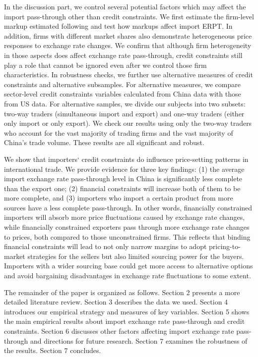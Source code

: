 In the discussion part, we control several potential factors which may affect the import pass-through other than credit constraints. We first estimate the firm-level markup estimated following \cite{dlw2012} and test how markups affect import ERPT. In addition, firms with different market shares also demonstrate heterogeneous price responses to exchange rate changes. We confirm that although firm heterogeneity in those aspects does affect exchange rate pass-through, credit constraints still play a role that cannot be ignored even after we control those firm characteristics. In robustness checks, we further use alternative measures of credit constraints and alternative subsamples. For alternative measures, we compare sector-level credit constraints variables calculated from China data with those from US data. For alternative samples, we divide our subjects into two subsets: two-way traders (simultaneous import and export) and one-way traders (either only import or only export). We check our results using only the two-way traders who account for the vast majority of trading firms and the vast majority of China's trade volume. These results are all significant and robust.

We show that importers‘ credit constraints do influence price-setting patterns in international trade. We provide evidence for three key findings: (1) the average import exchange rate pass-through level in China is significantly less complete than the export one; (2) financial constraints will increase both of them to be more complete, and (3) importers who import a certain product from more sources have a less complete pass-through. In other words, financially constrained importers will absorb more price fluctuations caused by exchange rate changes, while financially constrained exporters pass through more exchange rate changes to prices, both compared to those unconstrained firms. This reflects that binding financial constraints will lead to not only narrow margins to adopt pricing-to-market strategies for the sellers but also limited sourcing power for the buyers. Importers with a wider sourcing base could get more access to alternative options and avoid bargaining disadvantages in exchange rate fluctuations to some extent.

The remainder of the paper is organized as follows. Section 2 presents a more detailed literature review. Section 3 describes the data we used. Section 4 introduces our empirical strategy and measures of key variables. Section 5 shows the main empirical results about import exchange rate pass-through and credit constraints. Section 6 discusses other factors affecting import exchange rate pass-through and directions for future research. Section 7 examines the robustness of the results. Section 7 concludes.

\newpage